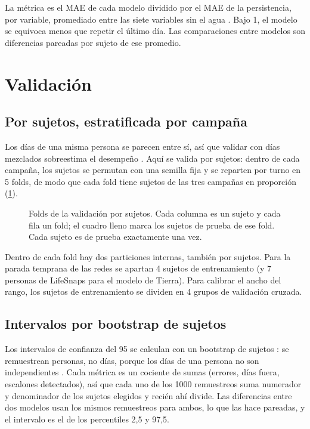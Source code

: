La métrica es el MAE de cada modelo dividido por el MAE de la persistencia, por variable, promediado entre las siete
variables sin el agua \parencite{hyndman2006}. Bajo 1, el modelo se equivoca menos que repetir el último día. Las
comparaciones entre modelos son diferencias pareadas por sujeto de ese promedio.

\section{Validación}\label{sec:validacion}

\subsection{Por sujetos, estratificada por campaña}

Los días de una misma persona se parecen entre sí, así que validar con días mezclados sobreestima el desempeño
\parencite{saeb2017}. Aquí se valida por sujetos: dentro de cada campaña, los sujetos se permutan con una semilla fija
y se reparten por turno en 5 folds, de modo que cada fold tiene sujetos de las tres campañas en proporción
(\cref{fig:folds}).

\begin{figure}[htbp]
\centering

\caption[Folds de la validación por sujetos]{Folds de la validación por sujetos. Cada columna es un sujeto y cada fila
un fold; el cuadro lleno marca los sujetos de prueba de ese fold. Cada sujeto es de prueba exactamente una vez.}
\label{fig:folds}
\end{figure}

Dentro de cada fold hay dos particiones internas, también por sujetos. Para la parada temprana de las redes se apartan
4 sujetos de entrenamiento (y 7 personas de LifeSnaps para el modelo de Tierra). Para calibrar el ancho del rango, los
sujetos de entrenamiento se dividen en 4 grupos de validación cruzada.

\subsection{Intervalos por bootstrap de sujetos}

Los intervalos de confianza del 95\pct{} se calculan con un bootstrap de sujetos \parencite{efron1979,efron1993}: se
remuestrean personas, no días, porque los días de una persona no son independientes \parencite{field2007}. Cada
métrica es un cociente de sumas (errores, días fuera, escalones detectados), así que cada uno de los 1000 remuestreos
suma numerador y denominador de los sujetos elegidos y recién ahí divide. Las diferencias entre dos modelos usan los
mismos remuestreos para ambos, lo que las hace pareadas, y el intervalo es el de los percentiles 2,5 y 97,5.

